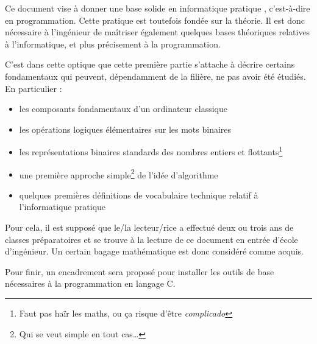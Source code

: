 \documentclass[../../main.tex]{subfiles}
\begin{document}
Ce document vise à donner une base solide en informatique \og pratique \fg{}, c'est-à-dire en programmation.
Cette pratique est toutefois fondée sur la théorie. Il est donc nécessaire à l'ingénieur de maîtriser
également quelques bases théoriques relatives à l'informatique, et plus précisement à la programmation.

C'est dans cette optique que cette première partie s'attache à décrire certains fondamentaux qui
peuvent, dépendamment de la filière, ne pas avoir été étudiés. En particulier :
\begin{itemize}
	\item les composants fondamentaux d'un ordinateur classique
	\item les opérations logiques élémentaires sur les mots binaires
	\item les représentations binaires standards des nombres entiers et flottants\footnote{Faut pas haïr les maths, ou ça risque d'être \textit{complicado}}
	\item une première approche simple\footnote{Qui se veut simple en tout cas\dots} de l'idée d'algorithme
	\item quelques premières définitions de vocabulaire technique relatif à l'informatique pratique
\end{itemize}
Pour cela, il est supposé que le/la lecteur/rice a effectué deux ou trois ans de classes préparatoires et
se trouve à la lecture de ce document en entrée d'école d'ingénieur. Un certain bagage mathématique
est donc considéré comme acquis.

Pour finir, un encadrement sera proposé pour installer les outils de base nécessaires à la programmation
en langage C.

\hrulefill
\newpage
\end{document}
